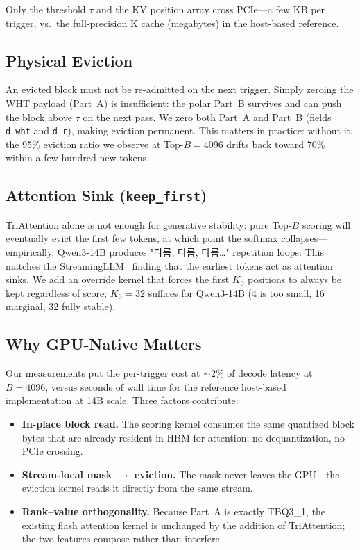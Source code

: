 \documentclass[10pt,twocolumn]{article}
\begin{document}
Only the threshold $\tau$ and the KV position array cross PCIe---a few KB per trigger, vs.\ the full-precision K cache (megabytes) in the host-based reference.

\subsection{Physical Eviction}

An evicted block must not be re-admitted on the next trigger. Simply zeroing the WHT payload (Part~A) is insufficient: the polar Part~B survives and can push the block above $\tau$ on the next pass. We zero both Part~A and Part~B (fields \texttt{d\_wht} and \texttt{d\_r}), making eviction permanent. This matters in practice: without it, the 95\% eviction ratio we observe at Top-$B = 4096$ drifts back toward 70\% within a few hundred new tokens.

\subsection{Attention Sink (\texttt{keep\_first})}

TriAttention alone is not enough for generative stability: pure Top-$B$ scoring will eventually evict the first few tokens, at which point the softmax collapses---empirically, Qwen3-14B produces "다름, 다름, 다름\ldots" repetition loops. This matches the StreamingLLM~\cite{streamingllm2023} finding that the earliest tokens act as attention sinks. We add an override kernel that forces the first $K_0$ positions to always be kept regardless of score; $K_0 = 32$ suffices for Qwen3-14B (4 is too small, 16 marginal, 32 fully stable).

\subsection{Why GPU-Native Matters}

Our measurements put the per-trigger cost at $\sim$2\% of decode latency at $B = 4096$, versus seconds of wall time for the reference host-based implementation at 14B scale. Three factors contribute:

\begin{itemize}[leftmargin=*,topsep=2pt,itemsep=1pt]
\item \textbf{In-place block read.} The scoring kernel consumes the same quantized block bytes that are already resident in HBM for attention; no dequantization, no PCIe crossing.
\item \textbf{Stream-local mask $\to$ eviction.} The mask never leaves the GPU---the eviction kernel reads it directly from the same stream.
\item \textbf{Rank--value orthogonality.} Because Part~A is exactly TBQ3\_1, the existing flash attention kernel is unchanged by the addition of TriAttention; the two features compose rather than interfere.
\end{itemize}
\end{document}
